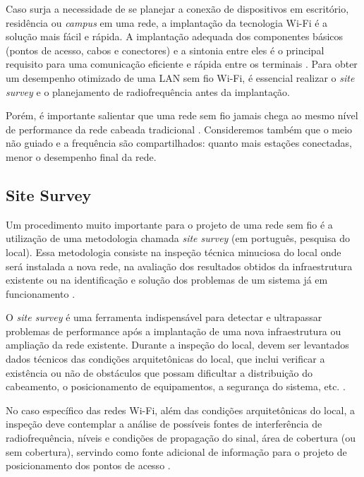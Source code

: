 Caso surja a necessidade de se planejar a conexão de dispositivos em escritório, residência ou \textit{campus} em uma rede, a implantação da tecnologia Wi-Fi é a solução mais fácil e rápida. A implantação adequada dos componentes básicos (pontos de acesso, cabos e conectores) e a sintonia entre eles é o principal requisito para uma comunicação eficiente e rápida entre os terminais \cite{kar2018ieee}. Para obter um desempenho otimizado de uma LAN sem fio Wi-Fi, é essencial realizar o \textit{site survey} e o planejamento de radiofrequência antes da implantação.

Porém, é importante salientar que uma rede sem fio jamais chega ao mesmo nível de performance da rede cabeada tradicional \cite{moraes2010}. Consideremos também que o meio não guiado e a frequência são compartilhados: quanto mais estações conectadas, menor o desempenho final da rede.

\subsection{Site Survey}
\label{subsec:site-survey}

Um procedimento muito importante para o projeto de uma rede sem fio é a utilização de uma metodologia chamada \textit{site survey} (em português, pesquisa do local). Essa metodologia consiste na inspeção técnica minuciosa do local onde será instalada a nova rede, na avaliação dos resultados obtidos da infraestrutura existente ou na identificação e solução dos problemas de um sistema já em funcionamento \cite{pinheiro2004site}.

O \textit{site survey} é uma ferramenta indispensável para detectar e ultrapassar problemas de performance após a implantação de uma nova infraestrutura ou ampliação da rede existente. Durante a inspeção do local, devem ser levantados dados técnicos das condições arquitetônicas do local, que inclui verificar a existência ou não de obstáculos que possam dificultar a distribuição do cabeamento, o posicionamento de equipamentos, a segurança do sistema, etc. \cite{moraes2010,pinheiro2004site}.

No caso específico das redes Wi-Fi, além das condições arquitetônicas do local, a inspeção deve contemplar a análise de possíveis fontes de interferência de radiofrequência, níveis e condições de propagação do sinal, área de cobertura (ou sem cobertura), servindo como fonte adicional de informação para o projeto de posicionamento dos pontos de acesso \cite{pinheiro2004site}. 

